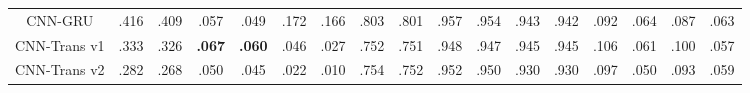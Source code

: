 \begin{table}[t]
{\begin{tabular}{@{} p{0.9cm} p{0.55cm} p{0.55cm} p{0.55cm} p{0.55cm} p{0.55cm} p{0.55cm} p{0.55cm} p{0.55cm} p{0.55cm} p{0.55cm} p{0.55cm} p{0.55cm} p{0.55cm} p{0.52cm} p{0.52cm} p{0.52cm} p{0.52cm} @{}}
\multicolumn{2}{c}{CNN-GRU}  
  & \multicolumn{1}{c}{.416}            
  & \multicolumn{1}{c}{.409}            
  & \multicolumn{1}{c}{.057}            
  & \multicolumn{1}{c}{.049}            
  & \multicolumn{1}{c}{.172}            
  & \multicolumn{1}{c}{.166}            
  & \multicolumn{1}{c}{.803}            
  & \multicolumn{1}{c}{.801}            
  & \multicolumn{1}{c}{.957}            
  & \multicolumn{1}{c}{.954}            
  & \multicolumn{1}{c}{.943}            
  & \multicolumn{1}{c}{.942}            
  & \multicolumn{1}{c}{.092}            
  & \multicolumn{1}{c}{.064}            
  & \multicolumn{1}{c}{.087}            
  & \multicolumn{1}{c}{.063}            
  \\

\multicolumn{2}{c}{CNN-Trans v1}  
  & \multicolumn{1}{c}{.333}            
  & \multicolumn{1}{c}{.326}            
  & \multicolumn{1}{c}{{\textbf{.067}}}   %
  & \multicolumn{1}{c}{{\textbf{.060}}}   %
  & \multicolumn{1}{c}{.046}            
  & \multicolumn{1}{c}{.027}            
  & \multicolumn{1}{c}{.752}            
  & \multicolumn{1}{c}{.751}            
  & \multicolumn{1}{c}{.948}            
  & \multicolumn{1}{c}{.947}            
  & \multicolumn{1}{c}{.945}            
  & \multicolumn{1}{c}{.945}            
  & \multicolumn{1}{c}{.106}            
  & \multicolumn{1}{c}{.061}            
  & \multicolumn{1}{c}{.100}            
  & \multicolumn{1}{c}{.057}            
  \\

\multicolumn{2}{c}{CNN-Trans v2}  
  & \multicolumn{1}{c}{.282}            
  & \multicolumn{1}{c}{.268}            
  & \multicolumn{1}{c}{.050}            
  & \multicolumn{1}{c}{.045}            
  & \multicolumn{1}{c}{.022}            
  & \multicolumn{1}{c}{.010}            
  & \multicolumn{1}{c}{.754}            
  & \multicolumn{1}{c}{.752}            
  & \multicolumn{1}{c}{.952}            
  & \multicolumn{1}{c}{.950}            
  & \multicolumn{1}{c}{.930}            
  & \multicolumn{1}{c}{.930}            
  & \multicolumn{1}{c}{.097}            
  & \multicolumn{1}{c}{.050}            
  & \multicolumn{1}{c}{.093}            
  & \multicolumn{1}{c}{.059}            
  \\
\midrule


\end{tabular}}
\end{table}
